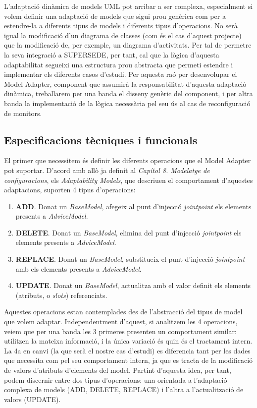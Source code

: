 L'adaptació dinàmica de models UML pot arribar a ser complexa, especialment si volem definir una adaptació de models que sigui prou genèrica com per a estendre-la a diferents tipus de models i diferents tipus d'operacions. No serà igual la modificació d'un diagrama de classes (com és el cas d'aquest projecte) que la modificació de, per exemple, un diagrama d'activitats. Per tal de permetre la seva integració a SUPERSEDE, per tant, cal que la lògica d'aquesta adaptabilitat segueixi una estructura prou abstracta que permeti estendre i implementar els diferents casos d'estudi. Per aquesta raó per desenvolupar el Model Adapter, component que assumirà la responsabilitat d'aquesta adaptació dinàmica, treballarem per una banda el disseny genèric del component, i per altra banda la implementació de la lògica necessària pel seu ús al cas de reconfiguració de monitors.\\

\subsection{Especificacions tècniques i funcionals}

El primer que necessitem és definir les diferents operacions que el Model Adapter pot suportar. D'acord amb allò ja definit al \textit{Capítol 8. Modelatge de configuracions}, els \textit{Adaptability Models}, que descriuen el comportament d'aquestes adaptacions, suporten 4 tipus d'operacions: 

\begin{enumerate}
\item \textbf{ADD}. Donat un \textit{BaseModel}, afegeix al punt d'injecció \textit{jointpoint} els elements presents a \textit{AdviceModel}.
\item \textbf{DELETE}. Donat un \textit{BaseModel}, elimina del punt d'injecció \textit{jointpoint} els elements presents a \textit{AdviceModel}.
\item \textbf{REPLACE}. Donat un \textit{BaseModel}, substitueix el punt d'injecció \textit{jointpoint} amb els elements presents a \textit{AdviceModel}.
\item \textbf{UPDATE}. Donat un \textit{BaseModel}, actualitza amb el valor definit els elements (atributs, o \textit{slots}) referenciats.
\end{enumerate}

Aquestes operacions estan contemplades des de l'abstracció del tipus de model que volem adaptar. Independentment d'aquest, si analitzem les 4 operacions, veiem que per una banda les 3 primeres presenten un comportament similar: utilitzen la mateixa informació, i la única variació és quin és el tractament intern. La 4a en canvi (la que serà el nostre cas d'estudi) es diferencia tant per les dades que necessita com pel seu comportament intern, ja que es tracta de la modificació de valors d'atributs d'elements del model. Partint d'aquesta idea, per tant, podem discernir entre dos tipus d'operacions: una orientada a l'adaptació complexa de models (ADD, DELETE, REPLACE) i l'altra a l'actualització de valors (UPDATE). 

